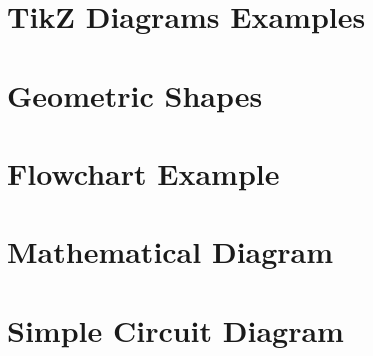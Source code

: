 \documentclass{article}
\begin{document}
\section{TikZ Diagrams Examples}

\section{Geometric Shapes}

\section{Flowchart Example}

\section{Mathematical Diagram}

\section{Simple Circuit Diagram}
\end{document}

